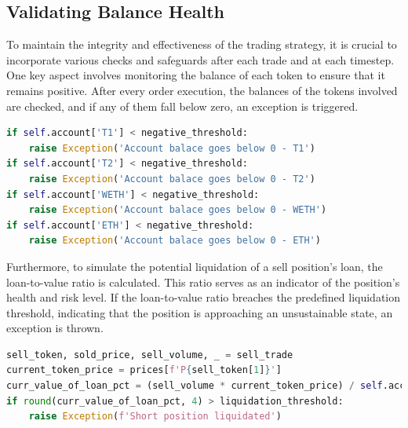 \subsection{Validating Balance Health}
To maintain the integrity and effectiveness of the trading strategy, it is crucial to incorporate various checks and safeguards after each trade and at each timestep. One key aspect involves monitoring the balance of each token to ensure that it remains positive. After every order execution, the balances of the tokens involved are checked, and if any of them fall below zero, an exception is triggered.
\begin{lstlisting}[language=Python]
if self.account['T1'] < negative_threshold:
    raise Exception('Account balace goes below 0 - T1')
if self.account['T2'] < negative_threshold:
    raise Exception('Account balace goes below 0 - T2')
if self.account['WETH'] < negative_threshold:
    raise Exception('Account balace goes below 0 - WETH')
if self.account['ETH'] < negative_threshold:
    raise Exception('Account balace goes below 0 - ETH')
\end{lstlisting}   
Furthermore, to simulate the potential liquidation of a sell position's loan, the loan-to-value ratio is calculated. This ratio serves as an indicator of the position's health and risk level. If the loan-to-value ratio breaches the predefined liquidation threshold, indicating that the position is approaching an unsustainable state, an exception is thrown.
\begin{lstlisting}[language=Python]
sell_token, sold_price, sell_volume, _ = sell_trade
current_token_price = prices[f'P{sell_token[1]}']
curr_value_of_loan_pct = (sell_volume * current_token_price) / self.account['collateral_WETH']
if round(curr_value_of_loan_pct, 4) > liquidation_threshold:
    raise Exception(f'Short position liquidated')
\end{lstlisting}

